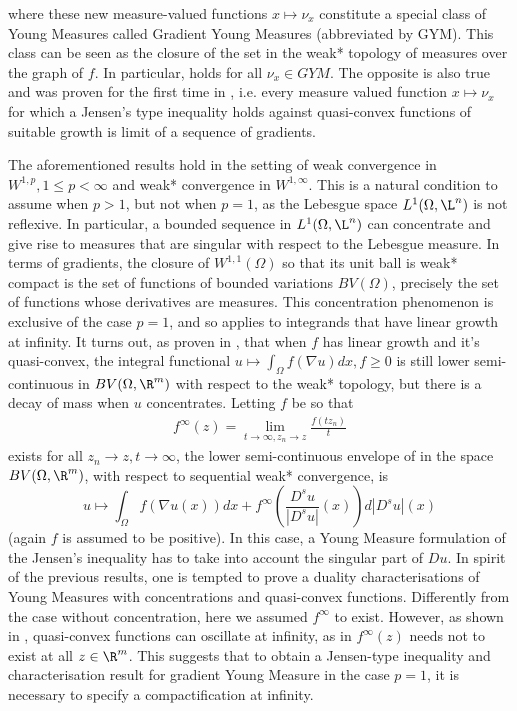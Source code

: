 where these new measure-valued functions $x\mapsto \nu_x$ constitute a special class of Young Measures called Gradient Young Measures (abbreviated by GYM). This class can be seen as the closure of the set  in the weak* topology of measures over the graph of $f$. In particular,  holds for all $\nu_x\in GYM$. The opposite is also true and was proven for the first time in \cite{kinderlehrer1991characterizations,kinderlehrer1994gradient}, i.e. every measure valued function $x\mapsto \nu_x$ for which a Jensen's type inequality holds against quasi-convex functions of suitable growth is limit of a sequence of gradients.

The aforementioned results hold in the setting of weak convergence in $W^{1,p}, 1\leq p<\infty$ and weak* convergence in $W^{1,\infty}$. This is a natural condition to assume when $p>1$, but not when $p=1$, as the Lebesgue space $L^1(\Omega,\L^n)$ is not reflexive. In particular, a bounded sequence in $L^1(\Omega,\L^n)$ can concentrate and give rise to measures that are singular with respect to the Lebesgue measure. In terms of gradients, the closure of $W^{1,1}(\Omega)$ so that its unit ball is weak* compact is the set of functions of bounded variations $BV(\Omega)$, precisely the set of functions whose derivatives are measures. This concentration phenomenon is exclusive of the case $p=1$, and so applies to integrands that have linear growth at infinity. It turns out, as proven in \cite{ambrosio1992relaxation}, that when $f$ has linear growth and it's quasi-convex, the integral functional $u\mapsto \int_\Omega f(\nabla u)dx,f\geq 0$ is still lower semi-continuous in $BV(\Omega,\R^m)$ with respect to the weak* topology, but there is a decay of mass when $u$ concentrates. Letting $f$ be so that
\begin{align}
f^\infty(z) = \lim_{t\to \infty,z_n\to z} \frac{f(tz_n)}{t}
\end{align}
exists for all $z_n\to z, t\to \infty$, the lower semi-continuous envelope of  in the space $BV(\Omega,\R^m)$, with respect to sequential weak* convergence, is
\begin{equation}
u\mapsto \int_\Omega f(\nabla u(x))dx + f^\infty \left( \frac{D^s u}{|D^s u|}(x) \right) d|D^s u|(x)
\end{equation}
(again $f$ is assumed to be positive). In this case, a Young Measure formulation of the Jensen's inequality  has to take into account the singular part of $Du$. In spirit of the previous results, one is tempted to prove a duality characterisations of Young Measures with concentrations and quasi-convex functions. Differently from the case without concentration, here we assumed $f^\infty$ to exist. However, as shown in \cite{muller1992quasiconvex}, quasi-convex functions can oscillate at infinity, as in $f^\infty(z)$ needs not to exist at all $z\in \R^m$. This suggests that to obtain a Jensen-type inequality and characterisation result for gradient Young Measure in the case $p=1$, it is necessary to specify a compactification at infinity.

